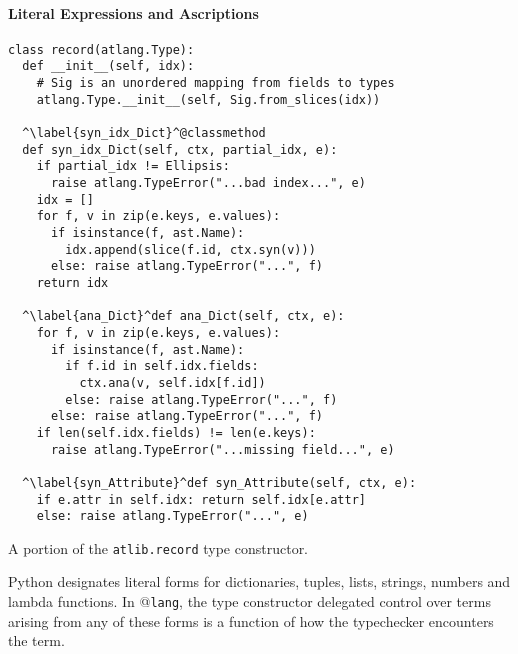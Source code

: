 \documentclass[9pt,preprint]{sigplanconf}
\begin{document}
\paragraph{Literal Expressions and Ascriptions}
\begin{codelisting}[t]
\begin{lstlisting}
class record(atlang.Type):
  def __init__(self, idx): 
    # Sig is an unordered mapping from fields to types
    atlang.Type.__init__(self, Sig.from_slices(idx))
    
  ^\label{syn_idx_Dict}^@classmethod
  def syn_idx_Dict(self, ctx, partial_idx, e):
    if partial_idx != Ellipsis: 
      raise atlang.TypeError("...bad index...", e)
    idx = []
    for f, v in zip(e.keys, e.values):
      if isinstance(f, ast.Name): 
        idx.append(slice(f.id, ctx.syn(v)))
      else: raise atlang.TypeError("...", f)
    return idx
    
  ^\label{ana_Dict}^def ana_Dict(self, ctx, e):
    for f, v in zip(e.keys, e.values):
      if isinstance(f, ast.Name):
        if f.id in self.idx.fields: 
          ctx.ana(v, self.idx[f.id])
        else: raise atlang.TypeError("...", f)
      else: raise atlang.TypeError("...", f)
    if len(self.idx.fields) != len(e.keys): 
      raise atlang.TypeError("...missing field...", e)

  ^\label{syn_Attribute}^def syn_Attribute(self, ctx, e):
    if e.attr in self.idx: return self.idx[e.attr]
    else: raise atlang.TypeError("...", e)
\end{lstlisting}
%
\caption{A portion of the \texttt{atlib.record} type constructor.}
\label{record}
\end{codelisting}
Python designates literal forms for dictionaries, tuples, lists, strings, numbers and lambda functions. In @\texttt{lang}, the type constructor delegated control over terms arising from any of these forms is a function of how the typechecker encounters the term.
\end{document}
